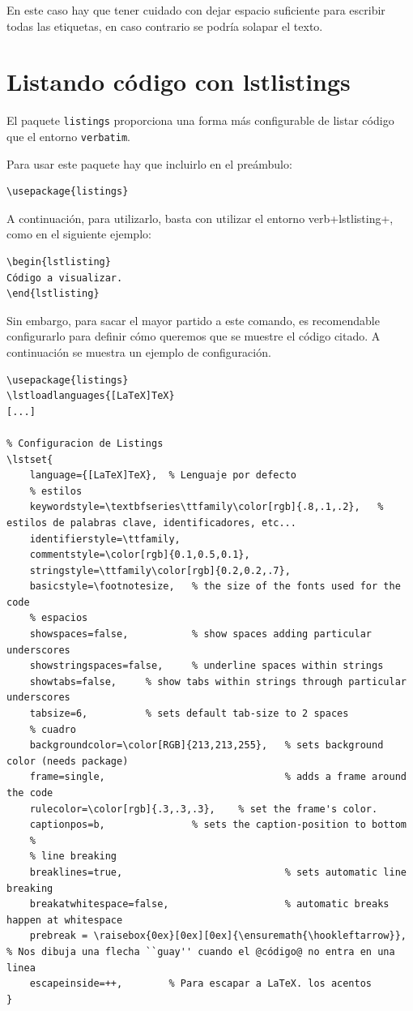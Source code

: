 \documentclass[12pt,a4paper, oneside]{report}
\begin{document}
En este caso hay que tener cuidado con dejar espacio suficiente para escribir todas las etiquetas, en caso contrario se podría solapar el texto.

\section{Listando código con lstlistings}

El paquete \verb+listings+ proporciona una forma más configurable de listar código que el entorno \verb+verbatim+.

Para usar este paquete hay que incluirlo en el preámbulo:

\begin{lstlisting}
\usepackage{listings}
\end{lstlisting}

A continuación, para utilizarlo, basta con utilizar el entorno verb+lstlisting+, como en el siguiente ejemplo:

\begin{verbatim}
\begin{lstlisting}
Código a visualizar.
\end{lstlisting}
\end{verbatim}

Sin embargo, para sacar el mayor partido a este comando, es recomendable configurarlo para definir cómo queremos que se muestre el código citado. A continuación se muestra un ejemplo de configuración.

\begin{lstlisting}
\usepackage{listings}
\lstloadlanguages{[LaTeX]TeX}
[...]

% Configuracion de Listings
\lstset{
	language={[LaTeX]TeX},	% Lenguaje por defecto
	% estilos
	keywordstyle=\textbfseries\ttfamily\color[rgb]{.8,.1,.2},	% estilos de palabras clave, identificadores, etc...
	identifierstyle=\ttfamily,
	commentstyle=\color[rgb]{0.1,0.5,0.1},			 
	stringstyle=\ttfamily\color[rgb]{0.2,0.2,.7},			
	basicstyle=\footnotesize, 	% the size of the fonts used for the code 
	% espacios
	showspaces=false, 			% show spaces adding particular underscores 
	showstringspaces=false,	 	% underline spaces within strings 
	showtabs=false, 	% show tabs within strings through particular underscores 
	tabsize=6,			% sets default tab-size to 2 spaces
	% cuadro
	backgroundcolor=\color[RGB]{213,213,255}, 	% sets background color (needs package) 
	frame=single, 								% adds a frame around the code
	rulecolor=\color[rgb]{.3,.3,.3},	% set the frame's color. 
	captionpos=b, 				% sets the caption-position to bottom 
	%
	% line breaking
	breaklines=true, 							% sets automatic line breaking 
	breakatwhitespace=false, 					% automatic breaks happen at whitespace 
	prebreak = \raisebox{0ex}[0ex][0ex]{\ensuremath{\hookleftarrow}}, % Nos dibuja una flecha ``guay'' cuando el @código@ no entra en una linea
	escapeinside=++,		% Para escapar a LaTeX. los acentos
}
\end{lstlisting}
\end{document}
